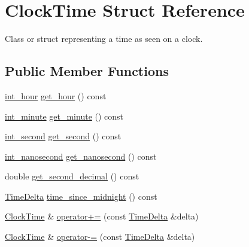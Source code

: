 \hypertarget{structClockTime}{\section{\-Clock\-Time \-Struct \-Reference}
\label{structClockTime}
}


\-Class or struct representing a time as seen on a clock.  


\subsection*{\-Public \-Member \-Functions}
\begin{DoxyCompactItemize}
\item 
\hyperlink{types_8h_afc81a27a9c08f0790f17b34bdf95cdb7}{int\-\_\-hour} \hyperlink{structClockTime_ab188f450c2b8519296c96529afc8d92f}{get\-\_\-hour} () const 
\item 
\hyperlink{types_8h_ae648329a919e6d860ef5ef2aac4ffb86}{int\-\_\-minute} \hyperlink{structClockTime_ae882482085d1cc290b055381f407cb6a}{get\-\_\-minute} () const 
\item 
\hyperlink{types_8h_acdee90940aea1c6f3e71652fb525a987}{int\-\_\-second} \hyperlink{structClockTime_a054e575b6ba259efdf3d79ebdf7fc501}{get\-\_\-second} () const 
\item 
\hyperlink{types_8h_a2a3f766e7346eb6ae01022cd28128ea6}{int\-\_\-nanosecond} \hyperlink{structClockTime_a4ddf3b506ad8f3576df034fbf3febae4}{get\-\_\-nanosecond} () const 
\item 
double \hyperlink{structClockTime_a174f09985d45efc748ca956c9ca2fb2e}{get\-\_\-second\-\_\-decimal} () const 
\item 
\hyperlink{structTimeDelta}{\-Time\-Delta} \hyperlink{structClockTime_a9c6423703cb0026435fb6e5b2d261d54}{time\-\_\-since\-\_\-midnight} () const 
\item 
\hyperlink{structClockTime}{\-Clock\-Time} \& \hyperlink{structClockTime_a8a98c385f805022b1bc229e472e8c1e9}{operator+=} (const \hyperlink{structTimeDelta}{\-Time\-Delta} \&delta)
\item 
\hyperlink{structClockTime}{\-Clock\-Time} \& \hyperlink{structClockTime_a50a16387217243bc8986735c7cebd012}{operator-\/=} (const \hyperlink{structTimeDelta}{\-Time\-Delta} \&delta)
\end{DoxyCompactItemize}
